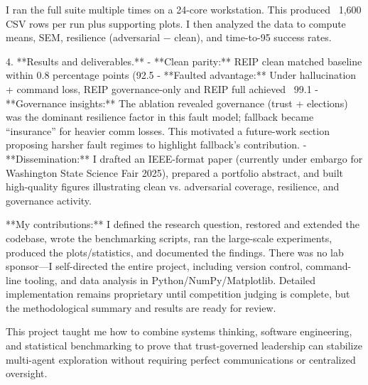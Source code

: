    I ran the full suite multiple times on a 24-core workstation. This produced ~1,600 CSV rows per run plus supporting plots. I then analyzed the data to compute means, SEM, resilience (adversarial − clean), and time-to-95 success rates.

4. **Results and deliverables.**  
   - **Clean parity:** REIP clean matched baseline within 0.8 percentage points (92.5%
   - **Faulted advantage:** Under hallucination + command loss, REIP governance-only and REIP full achieved ~99.1%
   - **Governance insights:** The ablation revealed governance (trust + elections) was the dominant resilience factor in this fault model; fallback became “insurance” for heavier comm losses. This motivated a future-work section proposing harsher fault regimes to highlight fallback’s contribution.
   - **Dissemination:** I drafted an IEEE-format paper (currently under embargo for Washington State Science Fair 2025), prepared a portfolio abstract, and built high-quality figures illustrating clean vs. adversarial coverage, resilience, and governance activity.

**My contributions:** I defined the research question, restored and extended the codebase, wrote the benchmarking scripts, ran the large-scale experiments, produced the plots/statistics, and documented the findings. There was no lab sponsor—I self-directed the entire project, including version control, command-line tooling, and data analysis in Python/NumPy/Matplotlib. Detailed implementation remains proprietary until competition judging is complete, but the methodological summary and results are ready for review.

This project taught me how to combine systems thinking, software engineering, and statistical benchmarking to prove that trust-governed leadership can stabilize multi-agent exploration without requiring perfect communications or centralized oversight.